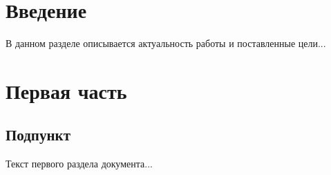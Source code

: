 \documentclass[paper=a4, fontsize=14pt, pagesize, DIV=calc, oneside]{scrreport}
\begin{document}
\pagestyle{empty} 



\newpage
\tableofcontents
\newpage

\pagestyle{plain}
\setcounter{page}{2} 





\chapter{Введение}









В данном разделе описывается актуальность работы и поставленные цели...





\chapter{Первая часть}














\section{Подпункт}







Текст первого раздела документа...


\end{document}
